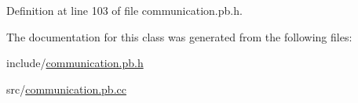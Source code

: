 Definition at line 103 of file communication.\-pb.\-h.



The documentation for this class was generated from the following files\-:\begin{DoxyCompactItemize}
\item 
include/\hyperlink{communication_8pb_8h}{communication.\-pb.\-h}\item 
src/\hyperlink{communication_8pb_8cc}{communication.\-pb.\-cc}\end{DoxyCompactItemize}
